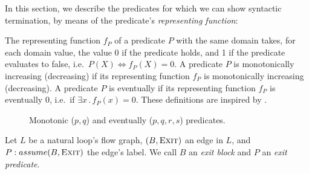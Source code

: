In this section, we describe the predicates for which we can show syntactic termination, by means of the predicate's \emph{representing function}:

\begin{definition}
    The representing function $f_P$ of a predicate $P$ with the same domain takes, for each domain value, the value 0 if the predicate holds, and 1 if the predicate evaluates to false, i.e.\ $P(X) \Leftrightarrow f_P(X) = 0$. A predicate $P$ is monotonically increasing (decreasing) if its representing function $f_P$ is monotonically increasing (decreasing). A predicate $P$ is eventually \true{} if its representing function $f_P$ is eventually 0, i.e.\ if $\exists x \,.\, f_P(x) = 0$. These definitions are inspired by \cite{DBLP:conf/cav/KroeningW11}.
\end{definition}

\begin{figure}
\caption{Monotonic ($p, q$) and eventually \true{} ($p, q, r, s$) predicates.}
\label{fig:monotonic_preds}
\end{figure}

\begin{definition}
    Let $L$ be a natural loop's flow graph, $(B, \textsc{Exit})$ an edge in $L$, and $P: assume(B, \textsc{Exit})$ the edge's label. We call $B$ an \emph{exit block} and $P$ an \emph{exit predicate}.
\end{definition}

